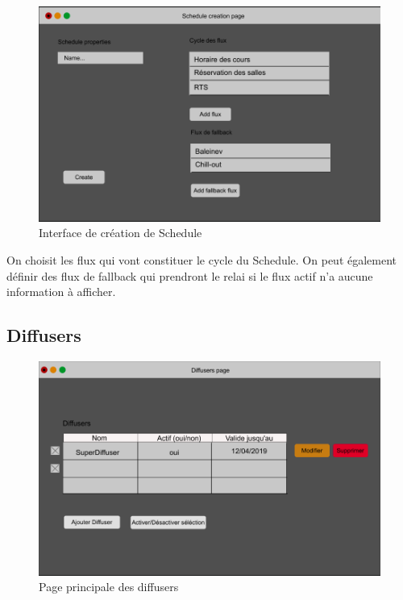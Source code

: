 \documentclass[french]{article}
\begin{document}
\begin{appendices}
	\begin{figure}[h]
		\centering
		\includegraphics[scale=0.3]{mockup/m_schedule_creation}
		\caption{Interface de création de Schedule}
		\label{fig:scheduleCreation}
	\end{figure}
	
	On choisit les flux qui vont constituer le cycle du Schedule. On peut également définir des flux de fallback qui prendront le relai si le flux actif n'a aucune information à afficher.

\newpage
\subsection{Diffusers}

	\begin{figure}[h]
		\centering
		\includegraphics[scale=0.3]{mockup/m_diffusers_page}
		\caption{Page principale des diffusers}
		\label{fig:diffuserPage}
	\end{figure}
	

\end{appendices}
\end{document}

